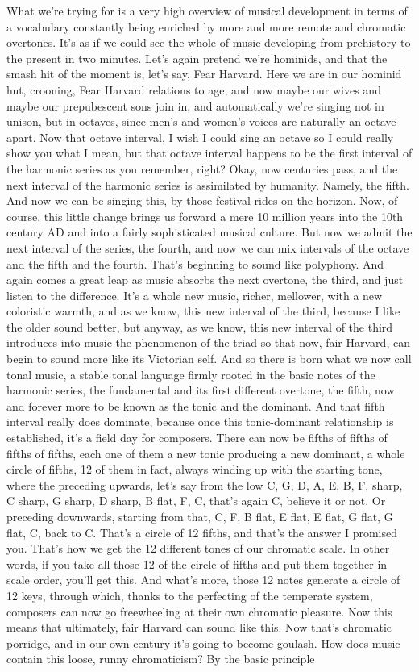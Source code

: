 What we're trying for is a very high overview of musical development in terms of a vocabulary constantly being enriched by more and more remote and chromatic overtones. It's as if we could see the whole of music developing from prehistory to the present in two minutes. Let's again pretend we're hominids, and that the smash hit of the moment is, let's say, Fear Harvard. Here we are in our hominid hut, crooning, Fear Harvard relations to age, and now maybe our wives and maybe our prepubescent sons join in, and automatically we're singing not in unison, but in octaves, since men's and women's voices are naturally an octave apart. Now that octave interval, I wish I could sing an octave so I could really show you what I mean, but that octave interval happens to be the first interval of the harmonic series as you remember, right? Okay, now centuries pass, and the next interval of the harmonic series is assimilated by humanity. Namely, the fifth. And now we can be singing this, by those festival rides on the horizon. Now, of course, this little change brings us forward a mere 10 million years into the 10th century AD and into a fairly sophisticated musical culture. But now we admit the next interval of the series, the fourth, and now we can mix intervals of the octave and the fifth and the fourth. That's beginning to sound like polyphony. And again comes a great leap as music absorbs the next overtone, the third, and just listen to the difference. It's a whole new music, richer, mellower, with a new coloristic warmth, and as we know, this new interval of the third, because I like the older sound better, but anyway, as we know, this new interval of the third introduces into music the phenomenon of the triad so that now, fair Harvard, can begin to sound more like its Victorian self. And so there is born what we now call tonal music, a stable tonal language firmly rooted in the basic notes of the harmonic series, the fundamental and its first different overtone, the fifth, now and forever more to be known as the tonic and the dominant. And that fifth interval really does dominate, because once this tonic-dominant relationship is established, it's a field day for composers. There can now be fifths of fifths of fifths of fifths, each one of them a new tonic producing a new dominant, a whole circle of fifths, 12 of them in fact, always winding up with the starting tone, where the preceding upwards, let's say from the low C, G, D, A, E, B, F, sharp, C sharp, G sharp, D sharp, B flat, F, C, that's again C, believe it or not. Or preceding downwards, starting from that, C, F, B flat, E flat, E flat, G flat, G flat, C, back to C. That's a circle of 12 fifths, and that's the answer I promised you. That's how we get the 12 different tones of our chromatic scale. In other words, if you take all those 12 of the circle of fifths and put them together in scale order, you'll get this. And what's more, those 12 notes generate a circle of 12 keys, through which, thanks to the perfecting of the temperate system, composers can now go freewheeling at their own chromatic pleasure. Now this means that ultimately, fair Harvard can sound like this. Now that's chromatic porridge, and in our own century it's going to become goulash. How does music contain this loose, runny chromaticism? By the basic principle 